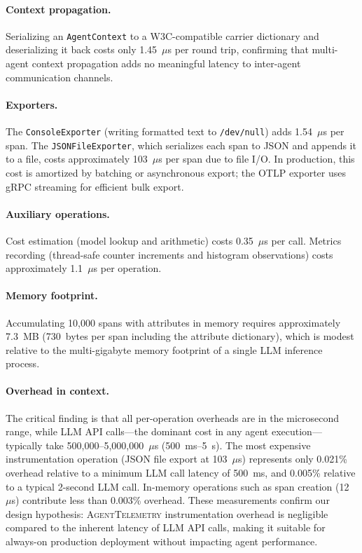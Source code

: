 \documentclass[sigconf,nonacm]{acmart}
\begin{document}
\paragraph{Context propagation.}
Serializing an \texttt{AgentContext} to a W3C-compatible carrier
dictionary and deserializing it back costs only 1.45~$\mu$s per
round trip, confirming that multi-agent context propagation adds no
meaningful latency to inter-agent communication channels.

\paragraph{Exporters.}
The \texttt{ConsoleExporter} (writing formatted text to
\texttt{/dev/null}) adds 1.54~$\mu$s per span.  The
\texttt{JSONFileExporter}, which serializes each span to JSON and
appends it to a file, costs approximately 103~$\mu$s per span due to
file I/O.  In production, this cost is amortized by batching or
asynchronous export; the OTLP exporter uses gRPC streaming for
efficient bulk export.

\paragraph{Auxiliary operations.}
Cost estimation (model lookup and arithmetic) costs 0.35~$\mu$s per
call.  Metrics recording (thread-safe counter increments and histogram
observations) costs approximately 1.1~$\mu$s per operation.

\paragraph{Memory footprint.}
Accumulating 10{,}000 spans with attributes in memory requires
approximately 7.3~MB (730~bytes per span including the attribute
dictionary), which is modest relative to the multi-gigabyte memory
footprint of a single LLM inference process.

\paragraph{Overhead in context.}
The critical finding is that all per-operation overheads are in the
microsecond range, while LLM API calls---the dominant cost in any
agent execution---typically take 500{,}000--5{,}000{,}000~$\mu$s
(500~ms--5~s).  The most expensive instrumentation operation
(JSON file export at 103~$\mu$s) represents only 0.021\% overhead
relative to a minimum LLM call latency of 500~ms, and 0.005\%
relative to a typical 2-second LLM call.  In-memory operations such
as span creation (12~$\mu$s) contribute less than 0.003\% overhead.
These measurements confirm our design hypothesis: \textsc{AgentTelemetry}
instrumentation overhead is negligible compared to the inherent
latency of LLM API calls, making it suitable for always-on production
deployment without impacting agent performance.
\end{document}
